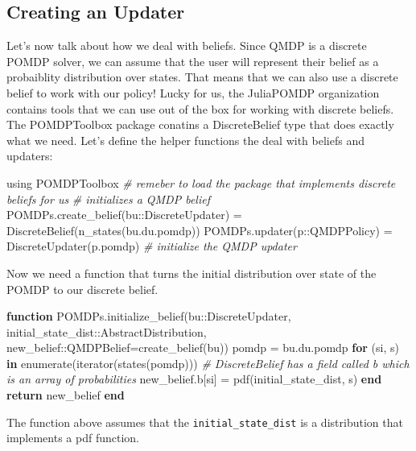 \documentclass[12pt,]{article}
\newenvironment{Shaded}{}{}
\newcommand{\KeywordTok}[1]{\textcolor[rgb]{0.00,0.44,0.13}{\textbf{{#1}}}}
\newcommand{\CommentTok}[1]{\textcolor[rgb]{0.38,0.63,0.69}{\textit{{#1}}}}
\newcommand{\NormalTok}[1]{{#1}}
\begin{document}
\subsection{Creating an Updater}\label{creating-an-updater}

Let's now talk about how we deal with beliefs. Since QMDP is a discrete
POMDP solver, we can assume that the user will represent their belief as
a probaiblity distribution over states. That means that we can also use
a discrete belief to work with our policy! Lucky for us, the JuliaPOMDP
organization contains tools that we can use out of the box for working
with discrete beliefs. The POMDPToolbox package conatins a
DiscreteBelief type that does exactly what we need. Let's define the
helper functions the deal with beliefs and updaters:

\begin{Shaded}
\begin{Highlighting}[]
\NormalTok{using POMDPToolbox }\CommentTok{# remeber to load the package that implements discrete beliefs for us}
\CommentTok{# initializes a QMDP belief}
\NormalTok{POMDPs.create_belief(bu::DiscreteUpdater) = DiscreteBelief(n_states(bu.du.pomdp)) }
\NormalTok{POMDPs.updater(p::QMDPPolicy) = DiscreteUpdater(p.pomdp) }\CommentTok{# initialize the QMDP updater}
\end{Highlighting}
\end{Shaded}

Now we need a function that turns the initial distribution over state of
the POMDP to our discrete belief.

\begin{Shaded}
\begin{Highlighting}[]
\KeywordTok{function} \NormalTok{POMDPs.initialize_belief(bu::DiscreteUpdater, }
        \NormalTok{initial_state_dist::AbstractDistribution, new_belief::QMDPBelief=create_belief(bu))}
    \NormalTok{pomdp = bu.du.pomdp}
    \KeywordTok{for} \NormalTok{(si, s) }\KeywordTok{in} \NormalTok{enumerate(iterator(states(pomdp)))}
        \CommentTok{# DiscreteBelief has a field called b which is an array of probabilities}
        \NormalTok{new_belief.b[si] = pdf(initial_state_dist, s) }
    \KeywordTok{end}
    \KeywordTok{return} \NormalTok{new_belief}
\KeywordTok{end}
\end{Highlighting}
\end{Shaded}

The function above assumes that the \texttt{initial\_state\_dist} is a
distribution that implements a pdf function.
\end{document}
